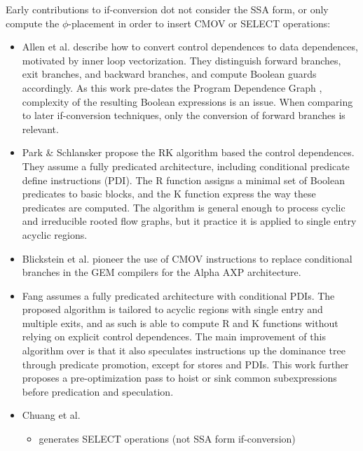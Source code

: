 Early contributions to if-conversion
dot not consider the SSA form, or only compute the $\phi$-placement in order to
insert CMOV or SELECT operations: \begin{itemize}

\item Allen et al. \cite{Allen:1983:POPL} describe how to convert control
dependences to data dependences, motivated by inner loop vectorization. They
distinguish forward branches, exit branches, and backward branches, and compute
Boolean guards accordingly. As this work pre-dates the Program Dependence Graph
\cite{Ferrante:1987:TOPLAS}, complexity of the resulting Boolean expressions is
an issue. When comparing to later if-conversion techniques, only the conversion
of forward branches is relevant.

\item Park \& Schlansker \cite{Park:1991:TR58} propose the RK algorithm based
the control dependences. They assume a fully predicated architecture, including
conditional predicate define instructions (PDI). The R function assigns a
minimal set of Boolean predicates to basic blocks, and the K function express
the way these predicates are computed. The algorithm is general enough to
process cyclic and irreducible rooted flow graphs, but it practice it is
applied to single entry acyclic regions.

\item Blickstein et al. \cite{Blickstein:1992:DTJ} pioneer the use of CMOV
instructions to replace conditional branches in the GEM compilers for the Alpha
AXP architecture.

\item Fang \cite{Fang:1996:LCPC} assumes a fully predicated architecture with
conditional PDIs. The proposed algorithm is tailored to acyclic regions with
single entry and multiple exits, and as such is able to compute R and K
functions without relying on explicit control dependences.  The main improvement
of this algorithm over \cite{Park:1991:TR58} is that it also speculates
instructions up the dominance tree through predicate promotion, except for
stores and PDIs. This work further proposes a pre-optimization pass to hoist or
sink common subexpressions before predication and speculation.

\item Chuang et al. \cite{Chuang:2003:CGO}
\begin{itemize}
\item generates SELECT operations (not SSA form if-conversion)
\end{itemize}

\end{itemize} 
